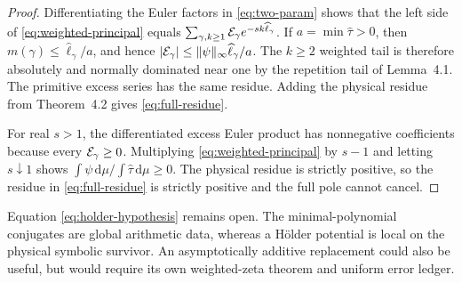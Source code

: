 \begin{proof}
Differentiating the Euler factors in \eqref{eq:two-param} shows that the left
side of \eqref{eq:weighted-principal} equals
\(\sum_{\gamma,k\ge1}\mathcal E_\gamma
e^{-sk\widehat\ell_\gamma}\).  If
\(a=\min\widehat\tau>0\), then
\(m(\gamma)\le\widehat\ell_\gamma/a\), and hence
\(|\mathcal E_\gamma|\le
\|\psi\|_\infty\widehat\ell_\gamma/a\).
The \(k\ge2\) weighted tail is therefore absolutely and normally dominated
near one by the repetition tail of Lemma~4.1.  The primitive excess series
has the same residue.  Adding the physical residue from Theorem~4.2 gives
\eqref{eq:full-residue}.

For real \(s>1\), the differentiated excess Euler product has nonnegative
coefficients because every \(\mathcal E_\gamma\ge0\).  Multiplying
\eqref{eq:weighted-principal} by \(s-1\) and letting \(s\downarrow1\) shows
\(\int\psi\,\mathrm d\mu/\int\widehat\tau\,\mathrm d\mu\ge0\).
The physical residue is strictly positive, so the residue in
\eqref{eq:full-residue} is strictly positive and the full pole cannot cancel.
\end{proof}

Equation \eqref{eq:holder-hypothesis} remains open.  The minimal-polynomial
conjugates are global arithmetic data, whereas a H\"older potential is local
on the physical symbolic survivor.  An asymptotically additive replacement
could also be useful, but would require its own weighted-zeta theorem and
uniform error ledger.
